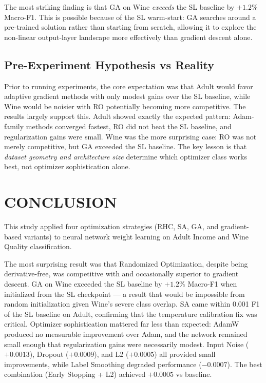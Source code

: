\documentclass[letterpaper, 10 pt, conference]{ieeeconf}
\begin{document}
The most striking finding is that GA on Wine \emph{exceeds} the SL baseline by $+1.2\%$ Macro-F1. This is possible because of the SL warm-start: GA searches around a pre-trained solution rather than starting from scratch, allowing it to explore the non-linear output-layer landscape more effectively than gradient descent alone.

\subsection{Pre-Experiment Hypothesis vs Reality}

Prior to running experiments, the core expectation was that Adult would favor adaptive gradient methods with only modest gains over the SL baseline, while Wine would be noisier with RO potentially becoming more competitive. The results largely support this. Adult showed exactly the expected pattern: Adam-family methods converged fastest, RO did not beat the SL baseline, and regularization gains were small. Wine was the more surprising case: RO was not merely competitive, but GA exceeded the SL baseline. The key lesson is that \emph{dataset geometry and architecture size} determine which optimizer class works best, not optimizer sophistication alone.

\section{CONCLUSION}

This study applied four optimization strategies (RHC, SA, GA, and gradient-based variants) to neural network weight learning on Adult Income and Wine Quality classification.

The most surprising result was that Randomized Optimization, despite being derivative-free, was competitive with and occasionally superior to gradient descent. GA on Wine exceeded the SL baseline by $+1.2\%$ Macro-F1 when initialized from the SL checkpoint --- a result that would be impossible from random initialization given Wine's severe class overlap. SA came within 0.001 F1 of the SL baseline on Adult, confirming that the temperature calibration fix was critical. Optimizer sophistication mattered far less than expected: AdamW produced no measurable improvement over Adam, and the network remained small enough that regularization gains were necessarily modest. Input Noise ($+0.0013$), Dropout ($+0.0009$), and L2 ($+0.0005$) all provided small improvements, while Label Smoothing degraded performance ($-0.0007$). The best combination (Early Stopping + L2) achieved $+0.0005$ vs baseline.
\end{document}
